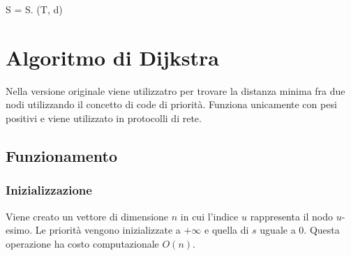 \begin{algorithm}[H]
\DontPrintSemicolon
{}





\SetKwFunction{}{}
\SetKwFunction{}{}
\SetKwFunction{}{}
\SetKwFunction{}{}
\SetKwFunction{}{}


\caption{(\protect\Int[], \protect\Int[])  \protect{}}
\DataStructure S = \DataStructureCos{}\;
S.\;
\Return (T, d)\;
\end{algorithm}
\section{Algoritmo di Dijkstra}
Nella versione originale viene utilizzatro per trovare la distanza minima fra due nodi utilizzando il concetto di code di priorit\`a. Funziona unicamente con pesi positivi e viene 
utilizzato in protocolli di rete.
\subsection{Funzionamento}
\subsubsection{Inizializzazione}
Viene creato un vettore di dimensione $n$ in cui l'indice $u$ rappresenta il nodo $u$-esimo. Le priorit\`a vengono inizializzate a $+\infty$ e quella di $s$ uguale a $0$. Questa 
operazione ha costo computazionale $O(n)$.
